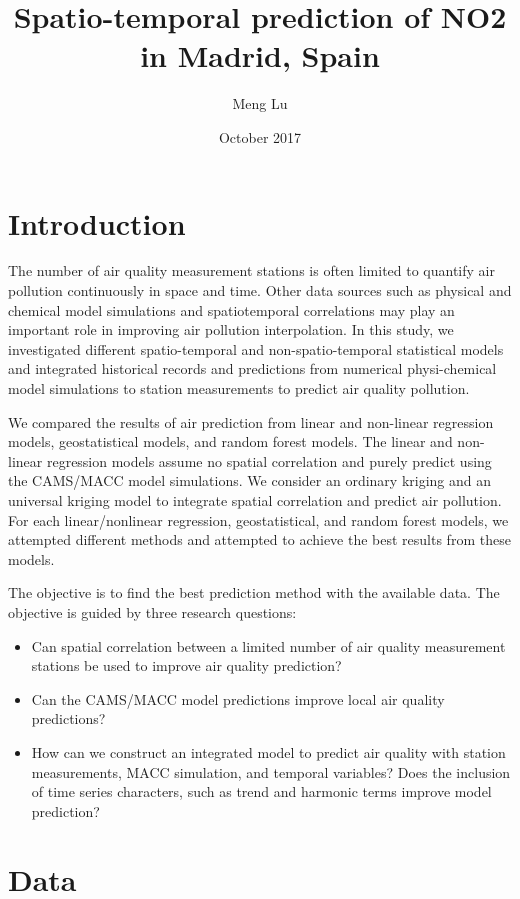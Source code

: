 \documentclass{article}
\title{Spatio-temporal prediction of NO2 in Madrid, Spain}
\author{Meng Lu}
\date{October 2017}
\begin{document}
\maketitle


\section{Introduction}

The number of air quality measurement stations is often limited to
quantify air pollution continuously in space and time. Other data
sources such as physical and chemical model simulations and
spatiotemporal correlations may play an important role in improving
air pollution interpolation. In this study, we investigated different
spatio-temporal and non-spatio-temporal statistical models and
integrated historical records and predictions from numerical
physi-chemical model simulations to station measurements to predict
air quality pollution.

We compared the results of air prediction from linear and non-linear
regression models, geostatistical models, and random forest
models. The linear and non-linear regression models assume no spatial
correlation and purely predict using the CAMS/MACC model
simulations. We consider an ordinary kriging and an universal kriging
model to integrate spatial correlation and predict air pollution. For
each linear/nonlinear regression, geostatistical, and random forest
models, we attempted different methods and attempted to achieve the
best results from these models.

The objective is to find the best prediction method with the available
data. The objective is guided by three research questions:
\begin{itemize}
\item Can spatial correlation between a limited number of air quality
  measurement stations be used to improve air quality prediction?
\item Can the CAMS/MACC model predictions improve local air quality
  predictions?
\item How can we construct an integrated model to predict air
  quality with station measurements, MACC simulation, and temporal
  variables? Does the inclusion of time series characters, such as
  trend and harmonic terms improve model prediction?
\end{itemize}

\section{Data}
\label{sec:data}
\end{document}
